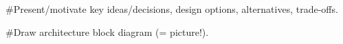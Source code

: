 #Present/motivate key ideas/decisions, design options, alternatives, trade-offs.

#Draw architecture block diagram (= picture!).
